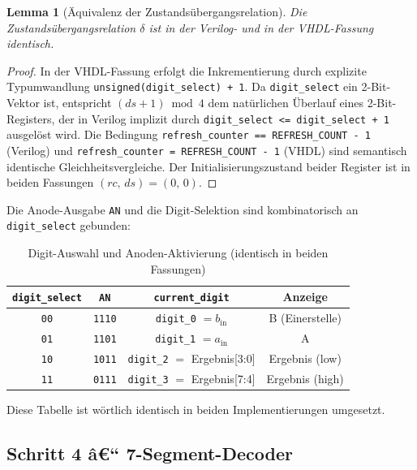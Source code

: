 ﻿\documentclass[12pt,a4paper]{report}
\newtheorem{lemma}[theorem]{Lemma}
\begin{document}
\begin{lemma}[Äquivalenz der Zustandsübergangsrelation]
	\label{lem:delta_equiv}
	Die Zustandsübergangsrelation $\delta$ ist in der Verilog- und in der
	VHDL-Fassung identisch.
\end{lemma}

\begin{proof}
	In der VHDL-Fassung erfolgt die Inkrementierung durch explizite Typumwandlung
	\texttt{unsigned(digit\_select) + 1}.  Da \texttt{digit\_select} ein
	2-Bit-Vektor ist, entspricht $(\mathit{ds} + 1) \bmod 4$ dem natürlichen
	Überlauf eines 2-Bit-Registers, der in Verilog implizit durch
	\texttt{digit\_select <= digit\_select + 1} ausgelöst wird.  Die Bedingung
	\texttt{refresh\_counter == REFRESH\_COUNT - 1} (Verilog) und
	\texttt{refresh\_counter = REFRESH\_COUNT - 1} (VHDL) sind semantisch
	identische Gleichheitsvergleiche.  Der Initialisierungszustand beider Register
	ist in beiden Fassungen $(\mathit{rc},\,\mathit{ds}) = (0,\,0)$.
\end{proof}

Die Anode-Ausgabe \texttt{AN} und die Digit-Selektion sind kombinatorisch an
\texttt{digit\_select} gebunden:

\begin{table}[H]
	\centering
	\begin{tabular}{|c|c|c|c|}
		\hline
		\textbf{\texttt{digit\_select}} & \textbf{\texttt{AN}} & \textbf{\texttt{current\_digit}} & \textbf{Anzeige} \\
		\hline
		\texttt{00} & \texttt{1110} & \texttt{digit\_0} $= b_\mathrm{in}$  & B (Einerstelle) \\
		\texttt{01} & \texttt{1101} & \texttt{digit\_1} $= a_\mathrm{in}$  & A \\
		\texttt{10} & \texttt{1011} & \texttt{digit\_2} $=$ Ergebnis[3:0]  & Ergebnis (low) \\
		\texttt{11} & \texttt{0111} & \texttt{digit\_3} $=$ Ergebnis[7:4]  & Ergebnis (high) \\
		\hline
	\end{tabular}
	\caption{Digit-Auswahl und Anoden-Aktivierung (identisch in beiden Fassungen)}
\end{table}

Diese Tabelle ist wörtlich identisch in beiden Implementierungen umgesetzt.

\subsection{Schritt 4 â€“ 7-Segment-Decoder}
\label{sssec:seg_decoder}
\end{document}
